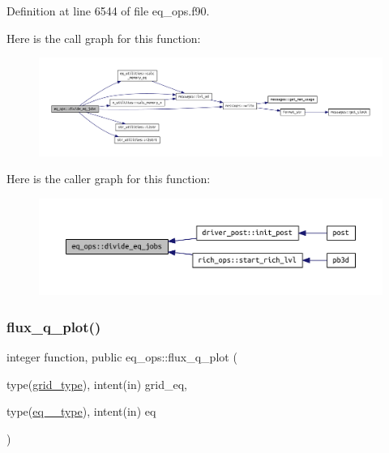 Definition at line 6544 of file eq\+\_\+ops.\+f90.

Here is the call graph for this function\+:\nopagebreak
\begin{figure}[H]
\begin{center}
\leavevmode
\includegraphics[width=350pt]{namespaceeq__ops_a8fae749abe55865d8135fef536a8e8f1_cgraph}
\end{center}
\end{figure}
Here is the caller graph for this function\+:\nopagebreak
\begin{figure}[H]
\begin{center}
\leavevmode
\includegraphics[width=350pt]{namespaceeq__ops_a8fae749abe55865d8135fef536a8e8f1_icgraph}
\end{center}
\end{figure}
\mbox{\label{namespaceeq__ops_af0effe20188d46a44680c2648e4572e9}} 
\subsubsection{\texorpdfstring{flux\+\_\+q\+\_\+plot()}{flux\_q\_plot()}}
{\footnotesize\ttfamily integer function, public eq\+\_\+ops\+::flux\+\_\+q\+\_\+plot (\begin{DoxyParamCaption}\item[{type(\hyperlink{structgrid__vars_1_1grid__type}{grid\+\_\+type}), intent(in)}]{grid\+\_\+eq,  }\item[{type(\hyperlink{structeq__vars_1_1eq__1__type}{eq\+\_\+1\+\_\+type}), intent(in)}]{eq }\end{DoxyParamCaption})}



